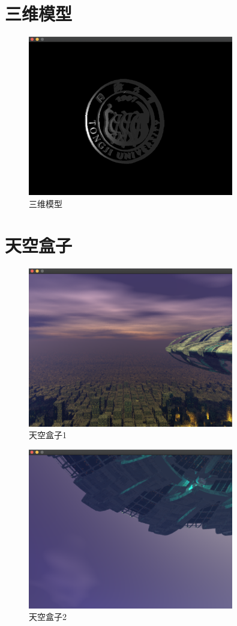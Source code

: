     \section{三维模型}
            \begin{figure}[H]
    	\centering
		\includegraphics[width=0.8\textwidth]{images/demo8.png}
		\caption{三维模型}
		\label{demo8}
    \end{figure} 
    
    \section{天空盒子}
            \begin{figure}[H]
    	\centering
		\includegraphics[width=0.8\textwidth]{images/demo9.png}
		\caption{天空盒子1}
		\label{demo9}
    \end{figure} 
    
                \begin{figure}[H]
    	\centering
		\includegraphics[width=0.8\textwidth]{images/demo10.png}
		\caption{天空盒子2}
		\label{demo10}
    \end{figure} 

